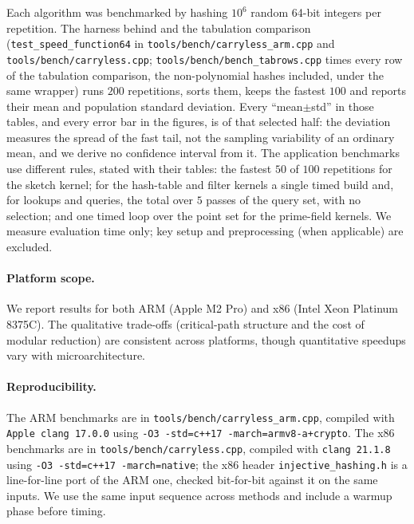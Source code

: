 \begin{sloppypar}
Each algorithm was benchmarked by hashing $10^6$ random 64-bit integers per
repetition.  The harness behind 
and the tabulation comparison (\texttt{test\_speed\_function64} in
\texttt{tools/bench/\allowbreak carryless\_arm.cpp} and
\texttt{tools/bench/\allowbreak carryless.cpp};
\texttt{tools/bench/\allowbreak bench\_tabrows.cpp} times every row of the tabulation comparison, the non-polynomial hashes included, under the same wrapper)
runs $200$ repetitions, sorts them, keeps the fastest $100$ and reports their
mean and population standard deviation.  Every ``mean$\pm$std'' in those
tables, and every error bar in the figures, is of that selected half: the
deviation measures the spread of the fast tail, not the sampling variability
of an ordinary mean, and we derive no confidence interval from it.  The
application benchmarks use different rules, stated with their tables: the
fastest $50$ of $100$ repetitions for the sketch kernel; for the hash-table
and filter kernels a single timed build and, for lookups and queries, the
total over $5$ passes of the query set, with no selection; and one timed loop
over the point set for the prime-field kernels.
We measure evaluation time only; key setup and preprocessing (when applicable) are excluded.
\end{sloppypar}

\paragraph{Platform scope.}
We report results for both ARM (Apple M2 Pro) and x86 (Intel Xeon Platinum
8375C).
The qualitative trade-offs (critical-path structure and the cost of modular reduction)
are consistent across platforms, though quantitative speedups vary with microarchitecture.

\paragraph{Reproducibility.}
\begin{sloppypar}
The ARM benchmarks are in \texttt{tools/bench/carryless\_arm.cpp}, compiled with
\texttt{Apple clang 17.0.0} using \texttt{-O3 -std=c++17 -march=armv8-a+crypto}.
The x86 benchmarks are in \texttt{tools/bench/carryless.cpp}, compiled with
\texttt{clang 21.1.8} using \texttt{-O3 -std=c++17 -march=native}; the x86
header \texttt{injective\_hashing.h} is a line-for-line port of the ARM one,
checked bit-for-bit against it on the same inputs.
We use the same input sequence across methods and include a warmup phase before timing.
\end{sloppypar}


